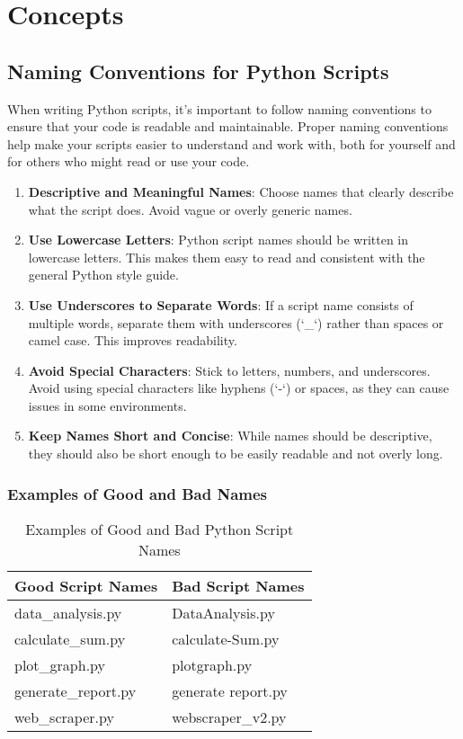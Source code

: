 \section{Concepts}


\subsection{Naming Conventions for Python Scripts}
When writing Python scripts, it's important to follow naming conventions to ensure that your code is readable and maintainable. Proper naming conventions help make your scripts easier to understand and work with, both for yourself and for others who might read or use your code.
\begin{enumerate}
    \item \textbf{Descriptive and Meaningful Names}: Choose names that clearly describe what the script does. Avoid vague or overly generic names.
    
    \item \textbf{Use Lowercase Letters}: Python script names should be written in lowercase letters. This makes them easy to read and consistent with the general Python style guide.
    
    \item \textbf{Use Underscores to Separate Words}: If a script name consists of multiple words, separate them with underscores (`\_`) rather than spaces or camel case. This improves readability.
    
    \item \textbf{Avoid Special Characters}: Stick to letters, numbers, and underscores. Avoid using special characters like hyphens (`-`) or spaces, as they can cause issues in some environments.
    
    \item \textbf{Keep Names Short and Concise}: While names should be descriptive, they should also be short enough to be easily readable and not overly long.
\end{enumerate}

\subsubsection{Examples of Good and Bad Names}

\begin{table}[h!]
    \centering
    \begin{tabular}{|l|l|}
    \hline
    \textbf{Good Script Names} & \textbf{Bad Script Names} \\ \hline
    data\_analysis.py & DataAnalysis.py \\ \hline
    calculate\_sum.py & calculate-Sum.py \\ \hline
    plot\_graph.py & plotgraph.py \\ \hline
    generate\_report.py & generate report.py \\ \hline
    web\_scraper.py & webscraper\_v2.py \\ \hline
    \end{tabular}
    \caption{Examples of Good and Bad Python Script Names}
    \label{tab:script_naming_conventions}
\end{table}

